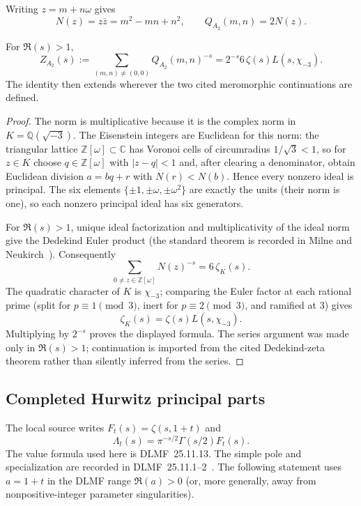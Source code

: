 Writing $z=m+n\omega$ gives
\[
 N(z)=z\overline z=m^2-mn+n^2,
 \qquad Q_{A_2}(m,n)=2N(z).
\]

\begin{theorem}
\label{thm:primitive-A2-epstein}
For $\Re(s)>1$,
\[
 Z_{A_2}(s):=\sum_{(m,n)\ne(0,0)}Q_{A_2}(m,n)^{-s}
 =2^{-s}6\,\zeta(s)L(s,\chi_{-3}).
\]
The identity then extends wherever the two cited meromorphic continuations
are defined.
\end{theorem}

\begin{proof}
The norm is multiplicative because it is the complex norm in
$K=\mathbb Q(\sqrt{-3})$.  The Eisenstein integers are Euclidean for this
norm: the triangular lattice $\mathbb Z[\omega]\subset\mathbb C$ has Voronoi
cells of circumradius $1/\sqrt3<1$, so for $z\in K$ choose
$q\in\mathbb Z[\omega]$ with $|z-q|<1$ and, after clearing a denominator,
obtain Euclidean division $a=bq+r$ with $N(r)<N(b)$.  Hence every nonzero
ideal is principal.  The six elements
\(\{\pm1,\pm\omega,\pm\omega^2\}\) are exactly the units (their norm is
one), so each nonzero principal ideal has six generators.

For $\Re(s)>1$, unique ideal factorization and multiplicativity of the ideal
norm give the Dedekind Euler product (the standard theorem is recorded in
Milne and Neukirch~\cite{milneANT2020,neukirch1999}).  Consequently
\[
 \sum_{0\ne z\in\mathbb Z[\omega]}N(z)^{-s}=6\,\zeta_K(s).
\]
The quadratic character of $K$ is $\chi_{-3}$; comparing the Euler factor at
each rational prime (split for $p\equiv1\pmod3$, inert for
$p\equiv2\pmod3$, and ramified at $3$) gives
\[
 \zeta_K(s)=\zeta(s)L(s,\chi_{-3}).
\]
Multiplying by $2^{-s}$ proves the displayed formula.  The series argument
was made only in $\Re(s)>1$; continuation is imported from the cited
Dedekind-zeta theorem rather than silently inferred from the series.
\end{proof}

\subsection{Completed Hurwitz principal parts}

The local source writes $F_t(s)=\zeta(s,1+t)$ and
\[
 \Lambda_t(s)=\pi^{-s/2}\Gamma(s/2)F_t(s).
\]
The value formula used here is DLMF~25.11.13.  The simple pole and
specialization are recorded in DLMF~25.11.1--2~\cite{apostolDLMF25}.
The following statement uses $a=1+t$ in the DLMF range $\Re(a)>0$ (or, more
generally, away from nonpositive-integer parameter singularities).

